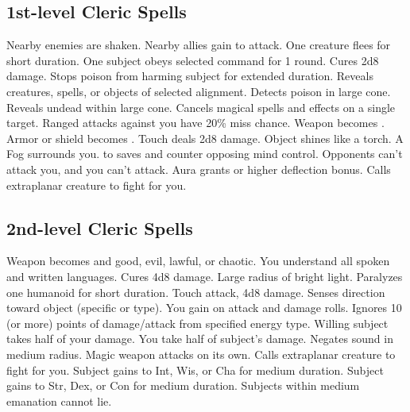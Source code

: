 \subsection{1st-level Cleric Spells}
\begin{spelllist}
 Nearby enemies are shaken.
 Nearby allies gain  to attack.
 One creature flees for short duration.
 One subject obeys selected command for 1 round.
 Cures 2d8 damage.
 Stops poison from harming subject for extended duration.
 Reveals creatures, spells, or objects of selected alignment.
 Detects poison in large cone.
 Reveals undead within large cone.
 Cancels magical spells and effects on a single target.
 Ranged attacks against you have 20\% miss chance.
 Weapon becomes .
 Armor or shield becomes .
 Touch deals 2d8 damage.
 Object shines like a torch.
 A Fog surrounds you.
  to saves and counter opposing mind control.
 Opponents can't attack you, and you can't attack.
 Aura grants  or higher deflection bonus.
 Calls extraplanar creature to fight for you.
\end{spelllist}

\subsection{2nd-level Cleric Spells}
\begin{spelllist}
 Weapon becomes  and good, evil, lawful, or chaotic.
 You understand all spoken and written languages.
 Cures 4d8 damage.
 Large radius of bright light.
 Paralyzes one humanoid for short duration.
 Touch attack, 4d8 damage.
 Senses direction toward object (specific or type).
 You gain  on attack and damage rolls.
 Ignores 10 (or more) points of damage/attack from specified energy type.
 Willing subject takes half of your damage.
\F You take half of subject's damage.
 Negates sound in medium radius.
 Magic weapon attacks on its own.
 Calls extraplanar creature to fight for you.
 Subject gains  to Int, Wis, or Cha for medium duration.
 Subject gains  to Str, Dex, or Con for medium duration.
 Subjects within medium emanation cannot lie.
\end{spelllist}

